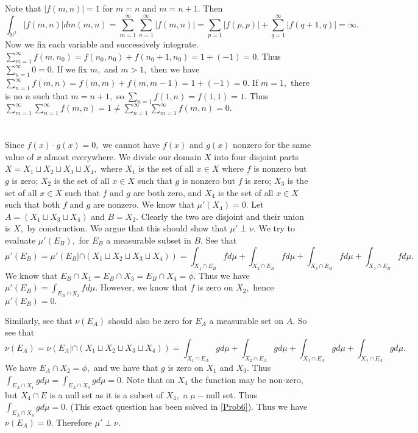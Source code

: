 \documentclass{article}
\begin{document}
\section{} %
Note that $|f(m,n)|=1$ for $m=n$ and $m=n+1.$ Then $$\int_{\mathbb{N}^2} |f(m,n)| dm(m,n)= \sum_{m=1}^{\infty} \sum_{n=1}^{\infty} |f(m,n)| = \sum_{p=1} |f(p,p)| + \sum_{q=1}^{\infty}|f(q+1,q)|=\infty.$$
Now we fix each variable and successively integrate. $\sum_{m=1}^{\infty} f(m,n_0)= f(n_0,n_0)+f(n_0+1,n_0)=1+ (-1)=0.$ Thus $\sum_{n=1}^{\infty}0=0.$ If we fix $m,$ and $m>1,$ then we have $\sum_{n=1}^{\infty} f(m,n)= f(m,m)+f(m,m-1)=1+(-1)=0.$ If $m=1,$ there is no $n$ such that $ m=n+1,$ so $\sum_{n=1}f(1,n)=f(1,1)=1.$ Thus $ \sum_{m=1}^{\infty} \sum_{n=1}^{\infty} f(m,n) = 1 \neq \sum_{n=1}^{\infty} \sum_{m=1}^{\infty} f(m,n) = 0.$
\section{} %

\section{} %
Since $f(x)\cdot g(x)=0,$ we cannot have $f(x)$ and $g(x)$ nonzero for the same value of $x$ almost everywhere. We divide our domain $X$ into four disjoint parts $X=X_1 \sqcup X_2 \sqcup X_3 \sqcup X_4,$ where $X_1$ is the set of all $x \in X$ where $f$ is nonzero but $g$ is zero; $X_2$ is the set of all $x \in X$ such that $g$ is nonzero but $f$ is zero; $X_3$ is the set of all $x \in X$ such that $f$ and $g$ are both zero, and $X_4$ is the set of all $x \in X$ such that both $f$ and $g$ are nonzero. We know that $\mu'(X_4)=0.$ Let $A= (X_1 \sqcup X_3 \sqcup X_4)$ and $B=X_2.$ Clearly the two are disjoint and their union is $X,$ by construction. We argue that this should show that $\mu' \perp \nu.$ We try to evaluate $\mu'(E_B),$ for $E_B$ a measurable subset in $B.$ See that $$ \mu'(E_B)=\mu'(E_B|\cap (X_1 \sqcup X_2 \sqcup X_3 \sqcup X_4))=\int_{X_1 \cap E_B}f d\mu + \int_{X_2 \cap E_B}f d\mu +\int_{X_3 \cap E_B}f d\mu +\int_{X_4 \cap E_B}f d\mu.$$ We know that $E_B \cap X_1=E_B \cap X_3=E_B \cap X_4=\phi.$ Thus we have $\mu'(E_B)= \int_{E_B \cap X_2}f d\mu.$ However, we know that $f$ is zero on $X_2,$ hence $\mu'(E_B)=0.$ 

Similarly, see that $\nu(E_A)$ should also be zero for $E_A$ a measurable set on $A$. So see that$$\nu(E_A)=\nu(E_A|\cap(X_1 \sqcup X_2 \sqcup X_3 \sqcup X_4))=\int_{X_1 \cap E_A}g d\mu + \int_{X_2 \cap E_A}g d\mu +\int_{X_3 \cap E_A}g d\mu +\int_{X_4 \cap E_A}g d\mu.$$ We have $E_A \cap X_2=\phi,$ and we have that $g$ is zero on $X_1$ and $X_3.$ Thus $\int_{E_A \cap X_1}g d\mu=\int_{E_A \cap X_3}g d\mu=0.$ Note that on $X_4$ the function may be non-zero, but $X_4 \cap E$ is a null set as it is a subset of $X_4,$ a $\mu-$null set. Thus $\int_{E_A \cap X_4}g d\mu =0.$ (This exact question has been solved in \ref{Prob6}). Thus we have $\nu(E_A)=0.$ Therefore $\mu' \perp \nu.$ 
\section{} %
\end{document}
